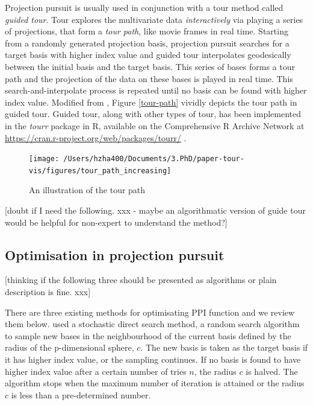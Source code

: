 \documentclass[12pt]{article}
\begin{document}
Projection pursuit is usually used in conjunction with a tour method
called \emph{guided tour}. Tour explores the multivariate data
\emph{interactively} via playing a series of projections, that form a
\emph{tour path}, like movie frames in real time. Starting from a
randomly generated projection basis, projection pursuit searches for a
target basis with higher index value and guided tour interpolates
geodesically between the initial basis and the target basis. This series
of bases forms a tour path and the projection of the data on these bases
is played in real time. This search-and-interpolate process is repeated
until no basis can be found with higher index value. Modified from
\citet{buja2005computational}, Figure \ref{tour-path} vividly depicts
the tour path in guided tour. Guided tour, along with other types of
tour, has been implemented in the \emph{tourr} package in R, available
on the Comprehensive R Archive Network at
\url{https://cran.r-project.org/web/packages/tourr/}
\citep{wickham2011tourrpackage}.

\begin{figure}
\texttt{[image: /Users/hzha400/Documents/3.PhD/paper-tour-vis/figures/tour\_path\_increasing]} \caption{\label{tour-path}An illustration of the tour path}\label{fig:tour-path}
\end{figure}

{[}doubt if I need the following. xxx - maybe an algorithmatic version
of guide tour would be helpful for non-expert to understand the
method?{]}

\hypertarget{optimisation-in-projection-pursuit}{%
\subsection{Optimisation in projection
pursuit}\label{optimisation-in-projection-pursuit}}

{[}thinking if the following three should be presented as algorithms or
plain description is fine. xxx{]}

There are three existing methods for optimisating PPI function and we
review them below. \citet{posse1995projection} used a stochastic direct
search method, a random search algorithm to sample new bases in the
neighbourhood of the current basis defined by the radius of the
p-dimensional sphere, \(c\). The new basis is taken as the target basis
if it has higher index value, or the sampling continues. If no basis is
found to have higher index value after a certain number of tries \(n\),
the radius \(c\) is halved. The algorithm stops when the maximum number
of iteration is attained or the radius \(c\) is less than a
pre-determined number.
\end{document}
